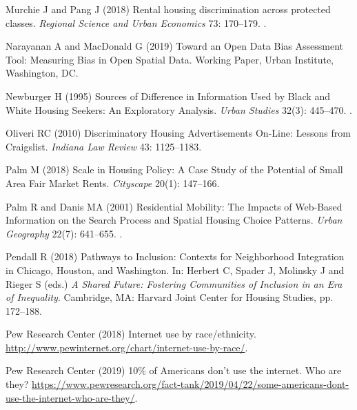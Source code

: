 \documentclass[11pt,letterpaper]{article}
\begin{document}
\begin{thebibliography}{77}
	Murchie J and Pang J (2018) Rental housing discrimination across protected
	classes.
	\newblock \emph{Regional Science and Urban Economics} 73: 170--179.
	\newblock {}.
	
	Narayanan A and MacDonald G (2019) Toward an {Open} {Data} {Bias} {Assessment}
	{Tool}: {Measuring} {Bias} in {Open} {Spatial} {Data}.
	\newblock Working {Paper}, Urban Institute, Washington, DC.
	
	Newburger H (1995) Sources of {Difference} in {Information} {Used} by {Black}
	and {White} {Housing} {Seekers}: {An} {Exploratory} {Analysis}.
	\newblock \emph{Urban Studies} 32(3): 445--470.
	\newblock {}.
	
	Oliveri RC (2010) Discriminatory {Housing} {Advertisements} {On}-{Line}:
	{Lessons} from {Craigslist}.
	\newblock \emph{Indiana Law Review} 43: 1125--1183.
	
	Palm M (2018) Scale in {Housing} {Policy}: {A} {Case} {Study} of the
	{Potential} of {Small} {Area} {Fair} {Market} {Rents}.
	\newblock \emph{Cityscape} 20(1): 147--166.
	
	Palm R and Danis MA (2001) Residential {Mobility}: {The} {Impacts} of
	{Web}-{Based} {Information} on the {Search} {Process} and {Spatial} {Housing}
	{Choice} {Patterns}.
	\newblock \emph{Urban Geography} 22(7): 641--655.
	\newblock {}.
	
	Pendall R (2018) Pathways to {Inclusion}: {Contexts} for {Neighborhood}
	{Integration} in {Chicago}, {Houston}, and {Washington}.
	\newblock In: Herbert C, Spader J, Molinsky J and Rieger S (eds.) \emph{A
		{Shared} {Future}: {Fostering} {Communities} of {Inclusion} in an {Era} of
		{Inequality}}. Cambridge, MA: Harvard Joint Center for Housing Studies, pp.
	172--188.
	
	{Pew Research Center} (2018) Internet use by race/ethnicity.
	\newblock
	\urlprefix\url{http://www.pewinternet.org/chart/internet-use-by-race/}.
	
	{Pew Research Center} (2019) 10\% of {Americans} don't use the internet. {Who}
	are they?
	\newblock
	\urlprefix\url{https://www.pewresearch.org/fact-tank/2019/04/22/some-americans-dont-use-the-internet-who-are-they/}.
	

\end{thebibliography}
\end{document}
